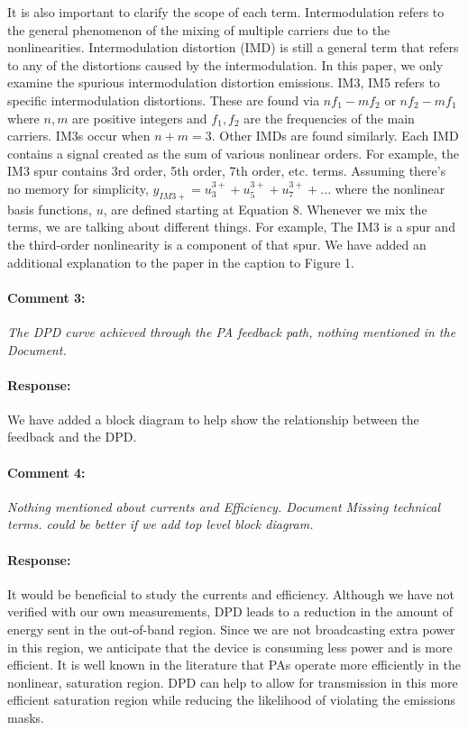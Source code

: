 \documentclass[]{article}
\begin{document}
It is also important to clarify the scope of each term. Intermodulation refers to the general phenomenon of the mixing of multiple carriers due to the nonlinearities. Intermodulation distortion (IMD) is still a general term that refers to any of the distortions caused by the intermodulation. In this paper, we only examine the spurious intermodulation distortion emissions. IM3, IM5 refers to specific intermodulation distortions. These are found via $n f_1 - m f_2$ or  $n f_2 - m f_1$ where $n,m$ are positive integers and $f_1, f_2$ are the frequencies of the main carriers. IM3s occur when $n+m = 3$. Other IMDs are found similarly. Each IMD contains a signal created as the sum of various nonlinear orders. For example, the IM3 spur contains 3rd order, 5th order, 7th order, etc. terms. Assuming there's no memory for simplicity, $y_{IM3+} = u_3^{3+} + u_5^{3+} + u_7^{3+} + ...$ where the nonlinear basis functions, $u$, are defined starting at Equation 8. Whenever we mix the terms, we are talking about different things. For example, The IM3 is a spur and the third-order nonlinearity is a component of that spur. 
We have added an additional explanation to the paper in the caption to Figure 1.

\paragraph{Comment 3:}\textit{The DPD curve achieved through the PA feedback path, nothing mentioned in the Document.}
\paragraph{Response:}
We have added a block diagram to help show the relationship between the feedback and the DPD. 
	
\paragraph{Comment 4:}\textit{Nothing mentioned about currents and Efficiency. Document Missing technical terms. could be better if we add top level block diagram.
}
\paragraph{Response:}
It would be beneficial to study the currents and efficiency. 
Although we have not verified with our own measurements, DPD leads to a reduction in the amount of energy sent in the out-of-band region. Since we are not broadcasting extra power in this region, we anticipate that the device is consuming less power and is more efficient. 
It is well known in the literature that PAs operate more efficiently in the nonlinear, saturation region. DPD can help to allow for transmission in this more efficient saturation region while reducing the likelihood of violating the emissions masks. 
\end{document}
